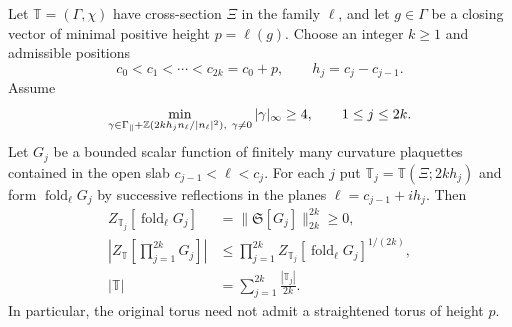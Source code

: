 \begin{proposition}\label{prop:unequal-slabs}
Let $\mathbb T=(\Gamma,\chi)$ have cross-section $\Xi$ in the family
$\ell$, and let $g\in\Gamma$ be a closing vector of minimal positive
height $p=\ell(g)$. Choose an integer $k\ge1$ and admissible positions
\[
 c_0<c_1<\cdots<c_{2k}=c_0+p,\qquad h_j=c_j-c_{j-1}.
\]
Assume
\begin{equation}\label{eq:sides-systole}
 \min_{\gamma\in\Gamma_\parallel+
       \mathbb Z(2kh_j n_\ell/|n_\ell|^2),\ \gamma\ne0}
       |\gamma|_\infty\ge4,\qquad 1\le j\le2k.
\end{equation}
Let $G_j$ be a bounded scalar function of finitely many curvature
plaquettes contained in the open slab $c_{j-1}<\ell<c_j$.
For each $j$ put $\mathbb T_j=\mathbb T(\Xi;2kh_j)$ and form
$\operatorname{fold}_\ell G_j$ by successive reflections in the
planes $\ell=c_{j-1}+ih_j$. Then
\begin{align}
 Z_{\mathbb T_j}[\operatorname{fold}_\ell G_j]
   &=\|\mathfrak S[G_j]\|_{2k}^{2k}\ge0,
       \label{eq:sides-slab-norm}\\
 \left|Z_{\mathbb T}\left[\prod_{j=1}^{2k}G_j\right]\right|
   &\le\prod_{j=1}^{2k}
       Z_{\mathbb T_j}[\operatorname{fold}_\ell G_j]^{1/(2k)},
       \label{eq:sides-holder}\\
 |\mathbb T|&=\sum_{j=1}^{2k}\frac{|\mathbb T_j|}{2k}.
       \label{eq:sides-volumes}
\end{align}
In particular, the original torus need not admit a straightened torus
of height $p$.
\end{proposition}

